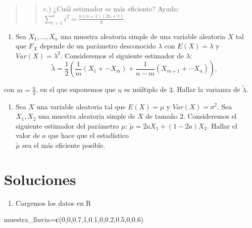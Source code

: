 \documentclass[]{article}
\newenvironment{Shaded}{\begin{snugshade}}{\end{snugshade}}
\newcommand{\DecValTok}[1]{\textcolor[rgb]{0.00,0.00,0.81}{#1}}
\newcommand{\FloatTok}[1]{\textcolor[rgb]{0.00,0.00,0.81}{#1}}
\newcommand{\KeywordTok}[1]{\textcolor[rgb]{0.13,0.29,0.53}{\textbf{#1}}}
\newcommand{\NormalTok}[1]{#1}
\providecommand{\tightlist}{%
  \setlength{\itemsep}{0pt}\setlength{\parskip}{0pt}}
\begin{document}
\begin{quote}
\begin{quote}
c.) ¿Cuál estimador es más eficiente? Ayuda:
\(\sum\limits_{i=1}^n i^2 = \frac{n (n+1) (2n+1)}{6}\).
\end{quote}
\end{quote}

\begin{enumerate}
\def\labelenumi{\arabic{enumi}.}
\setcounter{enumi}{20}
\tightlist
\item
  Sea \(X_1,\ldots,X_{n}\) una muestra aleatoria simple de una variable
  aleatoria \(X\) tal que \(F_X\) depende de un parámetro desconocido
  \(\lambda\) con \(E(X)=\lambda\) y \(Var(X)=\lambda^2\). Consideremos
  el siguiente estimador de \(\lambda\): \[
  \tilde{\lambda}=
  \frac{1}{2}\left(\frac{1}{m}(X_1+\cdots X_m)+\frac{1}{n-m}(X_{m+1}+
  \cdots X_n)\right),\]
\end{enumerate}

con \(m=\frac{n}{3}\), en el que suponemos que \(n\) es múltiplo de
\(3\). Hallar la varianza de \(\tilde{\lambda}\).

\begin{enumerate}
\def\labelenumi{\arabic{enumi}.}
\setcounter{enumi}{21}
\tightlist
\item
  Sea \(X\) una variable aleatoria tal que \(E(X)=\mu\) y
  \(Var(X)=\sigma^2\). Sea \(X_1,X_2\) una muestra aleatoria simple de
  \(X\) de tamaño \(2\). Consideremos el siguiente estimador del
  parámetro \(\mu\): \(\tilde{\mu}=2 a X_1 + (1-2 a) X_2\). Hallar el
  valor de \(a\) que hace que el estadístico\\
  \(\tilde{\mu}\) sea el más eficiente posible.
\end{enumerate}

\hypertarget{soluciones}{%
\section{Soluciones}\label{soluciones}}

\begin{enumerate}
\def\labelenumi{\arabic{enumi}.}
\tightlist
\item
  Cargemos los datos en R
\end{enumerate}

\begin{Shaded}
\begin{Highlighting}[]
\NormalTok{muestra_lluvia=}\KeywordTok{c}\NormalTok{(}\DecValTok{0}\NormalTok{,}\DecValTok{0}\NormalTok{,}\FloatTok{0.7}\NormalTok{,}\DecValTok{1}\NormalTok{,}\FloatTok{0.1}\NormalTok{,}\DecValTok{0}\NormalTok{,}\FloatTok{0.2}\NormalTok{,}\FloatTok{0.5}\NormalTok{,}\DecValTok{0}\NormalTok{,}\FloatTok{0.6}\NormalTok{)}
\end{Highlighting}
\end{Shaded}
\end{document}
